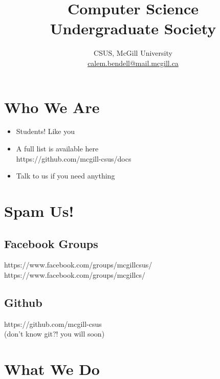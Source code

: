 

\title{Computer Science \\ Undergraduate Society \vspace*{2em}}
\author{
\large
CSUS, McGill University \\
\normalsize \href{mailto:calem.bendell@mail.mcgill.ca}{calem.bendell@mail.mcgill.ca}
}
\date{}



\maketitle

\clearpage

\section{Who We Are}

\begin{itemize}
	\item Students!  Like you
	\item A full list is available here \\ https://github.com/mcgill-csus/docs
	\item Talk to us if you need anything
\end{itemize}

\clearpage

\section{Spam Us!}

	\subsection{Facebook Groups}
		
		https://www.facebook.com/groups/mcgillcsus/ \\
		https://www.facebook.com/groups/mcgillcs/
		
	\subsection{Github}
	
		https://github.com/mcgill-csus \\
		(don't know git?!  you will soon)

\clearpage

\section{What We Do}

